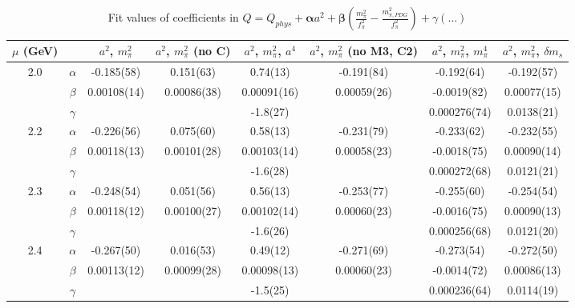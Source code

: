 \documentclass[12pt]{extarticle}
\begin{document}
\begin{table}[h!]
\begin{center}
\begin{tabular}{|c c|c|c|c|c|c|c|}
\hline
$\mu$ (GeV) &  & $a^2$, $m_\pi^2$& $a^2$, $m_\pi^2$ (no C)& $a^2$, $m_\pi^2$, $a^4$& $a^2$, $m_\pi^2$ (no M3, C2)& $a^2$, $m_\pi^2$, $m_\pi^4$& $a^2$, $m_\pi^2$, $\delta m_s$\\
\hline
\multirow{3}{0.5in}{2.0} & $\alpha$ & -0.185(58)& 0.151(63)& 0.74(13)& -0.191(84)& -0.192(64)& -0.192(57)\\
 & $\beta$ & 0.00108(14)& 0.00086(38)& 0.00091(16)& 0.00059(26)& -0.0019(82)& 0.00077(15)\\
 & $\gamma$ &  &  & -1.8(27)&  & 0.000276(74)& 0.0138(21)\\
\hline
\multirow{3}{0.5in}{2.2} & $\alpha$ & -0.226(56)& 0.075(60)& 0.58(13)& -0.231(79)& -0.233(62)& -0.232(55)\\
 & $\beta$ & 0.00118(13)& 0.00101(28)& 0.00103(14)& 0.00058(23)& -0.0018(75)& 0.00090(14)\\
 & $\gamma$ &  &  & -1.6(28)&  & 0.000272(68)& 0.0121(21)\\
\hline
\multirow{3}{0.5in}{2.3} & $\alpha$ & -0.248(54)& 0.051(56)& 0.56(13)& -0.253(77)& -0.255(60)& -0.254(54)\\
 & $\beta$ & 0.00118(12)& 0.00100(27)& 0.00102(14)& 0.00060(23)& -0.0016(75)& 0.00090(13)\\
 & $\gamma$ &  &  & -1.6(26)&  & 0.000256(68)& 0.0121(20)\\
\hline
\multirow{3}{0.5in}{2.4} & $\alpha$ & -0.267(50)& 0.016(53)& 0.49(12)& -0.271(69)& -0.273(54)& -0.272(50)\\
 & $\beta$ & 0.00113(12)& 0.00099(28)& 0.00098(13)& 0.00060(23)& -0.0014(72)& 0.00086(13)\\
 & $\gamma$ &  &  & -1.5(25)&  & 0.000236(64)& 0.0114(19)\\
\hline
\end{tabular}
\caption{Fit values of coefficients in $Q = Q_{phys} + \mathbf{\alpha} a^2 + \mathbf{\beta}\left(\frac{m_\pi^2}{f_\pi^2}-\frac{m_{\pi,PDG}^2}{f_\pi^2}\right) + \gamma(\ldots)$}
\end{center}
\end{table}







\end{document}
